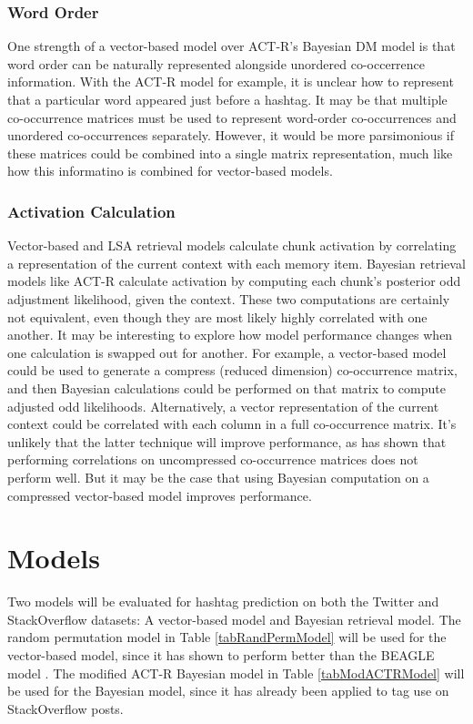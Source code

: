 \documentclass[man,floatsintext]{apa6}
\begin{document}
\subsubsection{Word Order}

One strength of a vector-based model over ACT-R's Bayesian DM model is that word order can be naturally represented alongside unordered co-occerrence information.
With the ACT-R model for example, it is unclear how to represent that a particular word appeared just before a hashtag. 
It may be that multiple co-occurrence matrices must be used to represent word-order co-occurrences and unordered co-occurrences separately.
However, it would be more parsimonious if these matrices could be combined into a single matrix representation, much like how this informatino is combined for vector-based models.

\subsubsection{Activation Calculation}

Vector-based and LSA retrieval models calculate chunk activation by correlating a representation of the current context with each memory item.
Bayesian retrieval models like ACT-R calculate activation by computing each chunk's posterior odd adjustment likelihood, given the context.
These two computations are certainly not equivalent, even though they are most likely highly correlated with one another.
It may be interesting to explore how model performance changes when one calculation is swapped out for another.
For example, a vector-based model could be used to generate a compress (reduced dimension) co-occurrence matrix, and then Bayesian calculations could be performed on that matrix to compute adjusted odd likelihoods.
Alternatively, a vector representation of the current context could be correlated with each column in a full co-occurrence matrix.
It's unlikely that the latter technique will improve performance, as \textcite{Landauer1997} has shown that performing correlations on uncompressed co-occurrence matrices does not perform well.
But it may be the case that using Bayesian computation on a compressed vector-based model improves performance.

\section{Models}

Two models will be evaluated for hashtag prediction on both the Twitter and StackOverflow datasets:
A vector-based model and Bayesian retrieval model.
The random permutation model \parencite{Sahlgren2008} in Table \ref{tabRandPermModel} will be used for the vector-based model, since it has shown to perform better than the BEAGLE model \parencite{Recchia2010}.
The modified ACT-R Bayesian model \parencite{Stanley2013} in Table \ref{tabModACTRModel} will be used for the Bayesian model, since it has already been applied to tag use on StackOverflow posts.
\end{document}
